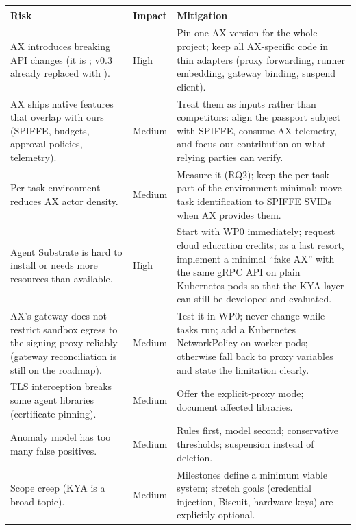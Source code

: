 \begin{center}
\small
\begin{tabularx}{\linewidth}{@{}L{4.2cm}L{1.4cm}Y@{}}
\toprule
\textbf{Risk} & \textbf{Impact} & \textbf{Mitigation}\\
\midrule
AX introduces breaking API changes (it is ; v0.3 already replaced  with ). & High & Pin one AX version for the whole project; keep all AX-specific code in thin adapters (proxy forwarding, runner embedding, gateway binding, suspend client).\\
AX ships native features that overlap with ours (SPIFFE, budgets, approval policies, telemetry). & Medium & Treat them as inputs rather than competitors: align the passport subject with SPIFFE, consume AX telemetry, and focus our contribution on what relying parties can verify.\\
Per-task environment reduces AX actor density. & Medium & Measure it (RQ2); keep the per-task part of the environment minimal; move task identification to SPIFFE SVIDs when AX provides them.\\
Agent Substrate is hard to install or needs more resources than available. & High & Start with WP0 immediately; request cloud education credits; as a last resort, implement a minimal ``fake AX'' with the same gRPC API on plain Kubernetes pods so that the KYA layer can still be developed and evaluated.\\
AX's gateway does not restrict sandbox egress to the signing proxy reliably (gateway reconciliation is still on the roadmap). & Medium & Test it in WP0; never change  while tasks run; add a Kubernetes NetworkPolicy on worker pods; otherwise fall back to proxy variables and state the limitation clearly.\\
TLS interception breaks some agent libraries (certificate pinning). & Medium & Offer the explicit-proxy mode; document affected libraries.\\
Anomaly model has too many false positives. & Medium & Rules first, model second; conservative thresholds; suspension instead of deletion.\\
Scope creep (KYA is a broad topic). & Medium & Milestones define a minimum viable system; stretch goals (credential injection, Biscuit, hardware keys) are explicitly optional.\\
\bottomrule
\end{tabularx}
\end{center}

